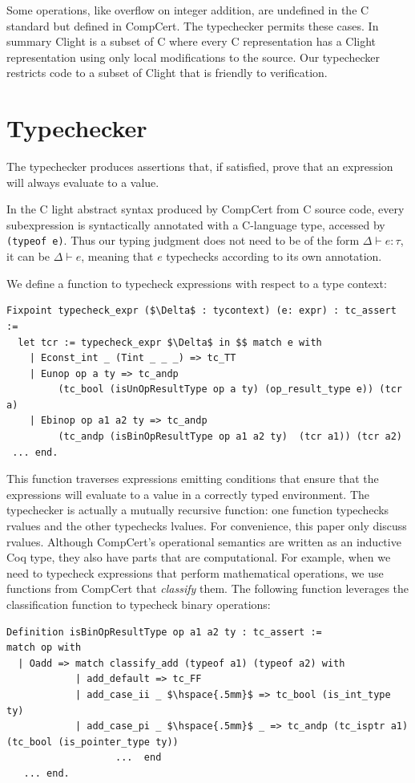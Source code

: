 \documentclass{puthesis}
\begin{document}
Some operations, like overflow on integer addition, are undefined in the C standard but defined in
CompCert. The typechecker permits these cases. In summary Clight is a
subset of C where every C representation has a Clight representation
using only local modifications to the source. Our typechecker
restricts code to a subset of Clight that is friendly to
verification. 

\section{Typechecker} 
\label{sec:typechecker}
The typechecker produces assertions that, if satisfied, prove that an
expression will always evaluate to a value.  

In the C light abstract syntax produced by CompCert from C source code,
every subexpression is syntactically annotated
with a C-language type, accessed by \lstinline{(typeof e)}. 
Thus our typing judgment does not need to be of the
form $\Delta \vdash e : \tau$, it can be
$\Delta \vdash e $, meaning that $e$ typechecks according to its
own annotation.

We define a function to typecheck expressions with respect to a type context:

\begin{lstlisting}
Fixpoint typecheck_expr ($\Delta$ : tycontext) (e: expr) : tc_assert :=
  let tcr := typecheck_expr $\Delta$ in $$ match e with
    | Econst_int _ (Tint _ _ _) => tc_TT 
    | Eunop op a ty => tc_andp 
         (tc_bool (isUnOpResultType op a ty) (op_result_type e)) (tcr a) 
    | Ebinop op a1 a2 ty => tc_andp 
         (tc_andp (isBinOpResultType op a1 a2 ty)  (tcr a1)) (tcr a2)
 ... end.
\end{lstlisting}

\noindent This function traverses expressions emitting conditions that
ensure that the expressions will evaluate to a value in a correctly
typed environment. The typechecker is actually a mutually recursive
function: one function typechecks rvalues and the other typechecks
lvalues.  For convenience, this paper only discuss rvalues.  Although
CompCert's operational semantics are written as an inductive Coq type,
they also have parts that are computational. For example, when we need
to typecheck expressions that perform mathematical operations, we use functions from CompCert
that \emph{classify} them. The following function leverages
the classification function to typecheck binary operations: 
\begin{lstlisting}
Definition isBinOpResultType op a1 a2 ty : tc_assert :=
match op with
  | Oadd => match classify_add (typeof a1) (typeof a2) with 
            | add_default => tc_FF
            | add_case_ii _ $\hspace{.5mm}$ => tc_bool (is_int_type ty) 
            | add_case_pi _ $\hspace{.5mm}$ _ => tc_andp (tc_isptr a1) (tc_bool (is_pointer_type ty)) 
                   ...  end   
   ... end.
\end{lstlisting}
\end{document}

